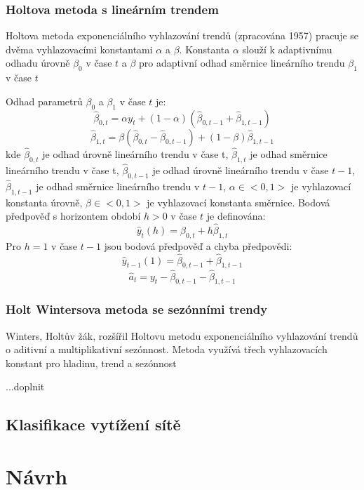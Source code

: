 \documentclass[thesis=M,czech]{FITthesis}[2012/06/26]
\begin{document}
\subsection{Holtova metoda s lineárním trendem}
Holtova metoda exponenciálního vyhlazování trendů (zpracována 1957) pracuje se dvěma vyhlazovacími konstantami $\alpha$ a $\beta$. Konstanta $\alpha$ slouží k adaptivnímu odhadu úrovně $\beta_{0}$ v čase $t$ a $\beta$ pro adaptivní odhad směrnice lineárního trendu $\beta_{1}$ v čase $t$\par
Odhad parametrů $\beta_{0}$ a $\beta_{1}$ v čase $t$ je:
\[ \hat{\beta}_{0,t} = \alpha y_{t} +(1 - \alpha)(\hat{\beta}_{0,t - 1} + \hat{\beta}_{1,t - 1}) \]
\[ \hat{\beta}_{1,t} = \beta(\hat{\beta}_{0,t} - \hat{\beta}_{0,t - 1}) + (1 -\beta)\hat{\beta}_{1,t - 1} \]
kde\newline
$\hat{\beta}_{0,t} $ je odhad úrovně lineárního trendu v čase t, \newline
$\hat{\beta}_{1,t}$ je odhad směrnice lineárního trendu v čase t, \newline
$\hat{\beta}_{0,t - 1}$ je odhad úrovně lineárního trendu v čase $t - 1$,\newline 
$\hat{\beta}_{1,t -1}$ je odhad směrnice lineárního trendu v $t - 1$,\newline 
$\alpha \in <0,1>$ je vyhlazovací konstanta úrovně,\newline 
$\beta \in <0,1>$ je vyhlazovací konstanta směrnice.
Bodová předpověď s horizontem období $h > 0$ v čase $t$ je definována:
\[ \hat{y}_{t}(h) = \hat{\beta}_{0,t} + h\hat{\beta}_{1,t} \]
Pro $h = 1$ v čase $t - 1$ jsou bodová předpověď a chyba předpovědi:
\[ \hat{y}_{t - 1}(1) = \hat{\beta}_{0,t - 1} + \hat{\beta}_{1,t - 1} \]
\[ \hat{a}_{t} = y_{t} - \hat{\beta}_{0,t - 1} - \hat{\beta}_{1,t - 1} \]
\subsection{Holt Wintersova metoda se sezónními trendy}
Winters, Holtův žák, rozšířil Holtovu metodu exponenciálního vyhlazování trendů o aditivní a multiplikativní sezónnost. Metoda využívá třech vyhlazovacích konstant pro hladinu, trend a sezónnost
\par...doplnit
\section{Klasifikace vytížení sítě}
 
\chapter{Návrh}
\end{document}
